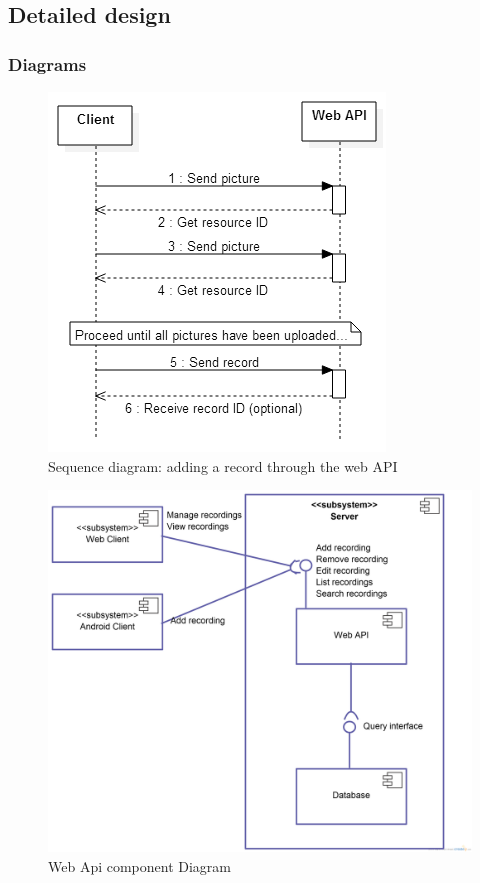 \begin{itemize}
\begin{itemize}
\begin{itemize}
\begin{itemize}
\subsection{Detailed design}
    \subsubsection{Diagrams}
        \begin{figure}
            \centering
            \includegraphics[scale=0.75]{server/working/SequenceDiagram-AddRecord.png}
            \caption{Sequence diagram: adding a record through the web API}
            \label{fig:addRecordSequenceDiagram}
        \end{figure}

        \begin{landscape}
            \begin{figure}
                \centering
                \includegraphics[scale=0.2]{server/ComponentDiagram.png}
                \caption{Web Api component Diagram}
                \label{fig:webAPIComponentDiagram}
            \end{figure}
        \end{landscape}


\end{itemize}
\end{itemize}
\end{itemize}
\end{itemize}
